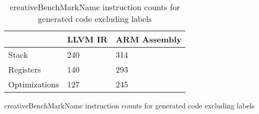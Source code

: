 \begin{table}[h!]
\centering
\begin{tabular}{p{}p{}p{}}
  \hline
 & LLVM IR & ARM Assembly \\ 
  \hline
Stack & 240 & 314 \\ 
  Registers & 140 & 293 \\ 
  Optimizations & 127 & 245 \\ 
   \hline
\end{tabular}
\caption{creativeBenchMarkName instruction counts for generated code excluding labels}
\caption{creativeBenchMarkName instruction counts for generated code excluding labels}
\end{table}
